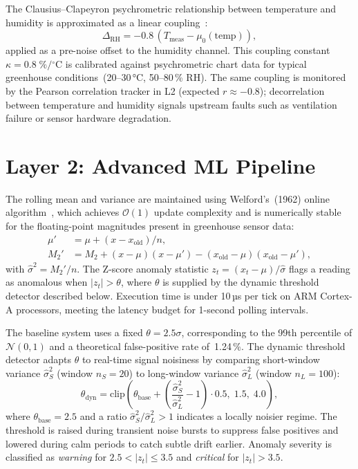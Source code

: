 \documentclass[journal,10pt,twocolumn]{IEEEtran}
\begin{document}
The Clausius--Clapeyron psychrometric relationship between temperature
and humidity is approximated as a linear coupling~\cite{Savvas2007}:
\begin{equation}
  \Delta_{\mathrm{RH}} = -0.8\,(T_{\mathrm{meas}} - \mu_0(\mathrm{temp})),
  \label{eq:coupling}
\end{equation}
applied as a pre-noise offset to the humidity channel.
This coupling constant $\kappa{=}0.8\;\%/{}^{\circ}\mathrm{C}$ is
calibrated against psychrometric chart data for typical greenhouse
conditions~(20--30\,°C, 50--80\,\% RH).
The same coupling is monitored by the Pearson correlation tracker in
L2 (expected $r\approx{-0.8}$); decorrelation between temperature
and humidity signals upstream faults such as ventilation failure or
sensor hardware degradation.

\section{Layer 2: Advanced ML Pipeline}
\label{sec:ml}

The rolling mean and variance are maintained using Welford's~(1962)
online algorithm~\cite{Welford1962}, which achieves $\mathcal{O}(1)$
update complexity and is numerically stable for the floating-point
magnitudes present in greenhouse sensor data:
\begin{align}
  \mu' &= \mu + (x - x_{\mathrm{old}})/n, \label{eq:wmu}\\
  M_2' &= M_2 + (x-\mu)(x-\mu') - (x_{\mathrm{old}}-\mu)(x_{\mathrm{old}}-\mu'),
  \label{eq:wm2}
\end{align}
with $\hat\sigma^2{=}M_2'/n$.
The Z-score anomaly statistic $z_t{=}(x_t-\mu)/\hat\sigma$ flags
a reading as anomalous when $|z_t|>\theta$, where $\theta$ is
supplied by the dynamic threshold detector described below.
Execution time is under 10\,µs per tick on ARM Cortex-A processors,
meeting the latency budget for 1-second polling intervals.

The baseline system uses a fixed $\theta{=}2.5\sigma$, corresponding
to the 99th percentile of $\mathcal{N}(0,1)$ and a theoretical
false-positive rate of~1.24\,\%.
The dynamic threshold detector adapts $\theta$ to real-time signal
noisiness by comparing short-window variance $\hat\sigma_S^2$
(window $n_S{=}20$) to long-window variance $\hat\sigma_L^2$
(window $n_L{=}100$):
\begin{equation}
  \theta_{\mathrm{dyn}} = \mathrm{clip}\!\left(
    \theta_{\mathrm{base}} + \left(\frac{\hat\sigma_S^2}{\hat\sigma_L^2} - 1\right)
    \cdot 0.5,\; 1.5,\; 4.0
  \right),
  \label{eq:dynth}
\end{equation}
where $\theta_{\mathrm{base}}{=}2.5$ and a ratio
$\hat\sigma_S^2/\hat\sigma_L^2{>}1$ indicates a locally noisier
regime. The threshold is raised during transient noise bursts to
suppress false positives and lowered during calm periods to catch
subtle drift earlier. Anomaly severity is classified as
\emph{warning} for $2.5{<}|z_t|{\le}3.5$ and \emph{critical} for
$|z_t|{>}3.5$.
\end{document}
